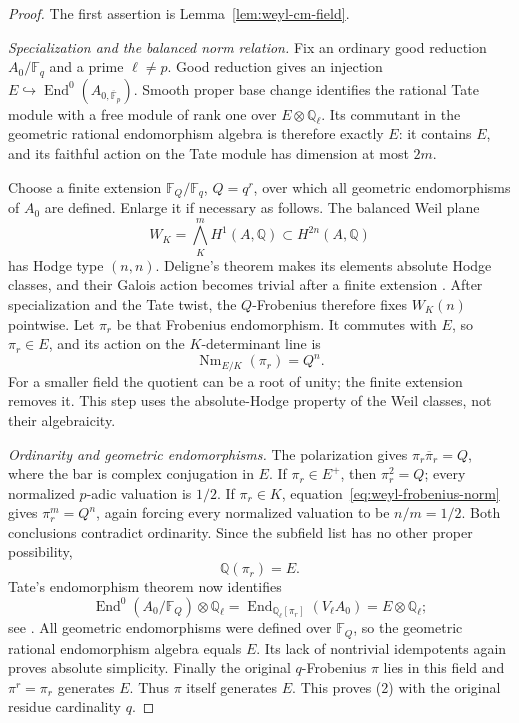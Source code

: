 \documentclass[11pt]{article}
\theoremstyle{definition}
\theoremstyle{remark}
\begin{document}
\begin{proof}
The first assertion is Lemma~\ref{lem:weyl-cm-field}.

\emph{Specialization and the balanced norm relation.}
Fix an ordinary good reduction $A_0/\mathbb F_q$ and a prime
$\ell\ne p$.  Good reduction gives an injection
$E\hookrightarrow\operatorname{End}^0(A_{0,\overline{\mathbb F}_p})$.
Smooth proper base change identifies the rational Tate module with
a free module of rank one over $E\otimes\mathbb Q_\ell$.
Its commutant in the geometric rational endomorphism algebra is
therefore exactly $E$: it contains $E$, and its faithful action on
the Tate module has dimension at most $2m$.

Choose a finite extension $\mathbb F_Q/\mathbb F_q$, $Q=q^r$,
over which all geometric endomorphisms of $A_0$ are defined.
Enlarge it if necessary as follows.  The balanced Weil plane
\[
 W_K=\bigwedge_K^m H^1(A,\mathbb Q)
 \subset H^{2n}(A,\mathbb Q)
\]
has Hodge type $(n,n)$.  Deligne's theorem makes its elements
absolute Hodge classes, and their Galois action becomes trivial
after a finite extension
\cite[Proposition~2.9(b), pp.~18--19, and Main Theorem~2.11,
p.~19]{DeligneAH82WO}.  After specialization and the Tate twist,
the $Q$-Frobenius therefore fixes $W_K(n)$ pointwise.
Let $\pi_r$ be that Frobenius endomorphism.  It commutes with $E$,
so $\pi_r\in E$, and its action on the $K$-determinant line is
\begin{equation}
 \label{eq:weyl-frobenius-norm}
 \operatorname{Nm}_{E/K}(\pi_r)=Q^n.
\end{equation}
For a smaller field the quotient can be a root of unity; the
finite extension removes it.  This step uses the absolute-Hodge
property of the Weil classes, not their algebraicity.

\emph{Ordinarity and geometric endomorphisms.}
The polarization gives $\pi_r\overline\pi_r=Q$, where the bar is
complex conjugation in $E$.  If $\pi_r\in E^+$, then
$\pi_r^2=Q$; every normalized $p$-adic valuation is $1/2$.
If $\pi_r\in K$, equation~\eqref{eq:weyl-frobenius-norm} gives
$\pi_r^m=Q^n$, again forcing every normalized valuation to be
$n/m=1/2$.  Both conclusions contradict ordinarity.  Since the
subfield list has no other proper possibility,
\[
 \mathbb Q(\pi_r)=E.
\]
Tate's endomorphism theorem now identifies
\[
 \operatorname{End}^0(A_0/\mathbb F_Q)\otimes\mathbb Q_\ell
 =\operatorname{End}_{\mathbb Q_\ell[\pi_r]}(V_\ell A_0)
 =E\otimes\mathbb Q_\ell;
\]
see \cite[\S1, Main Theorem, p.~134, and Lemma~1, p.~135]{Tate66WO}.
All geometric endomorphisms were defined over $\mathbb F_Q$, so
the geometric rational endomorphism algebra equals $E$.
Its lack of nontrivial idempotents again proves absolute
simplicity.  Finally the original $q$-Frobenius $\pi$ lies in this
field and $\pi^r=\pi_r$ generates $E$.  Thus $\pi$ itself generates
$E$.  This proves (2) with the original residue cardinality $q$.


\end{proof}
\end{document}

